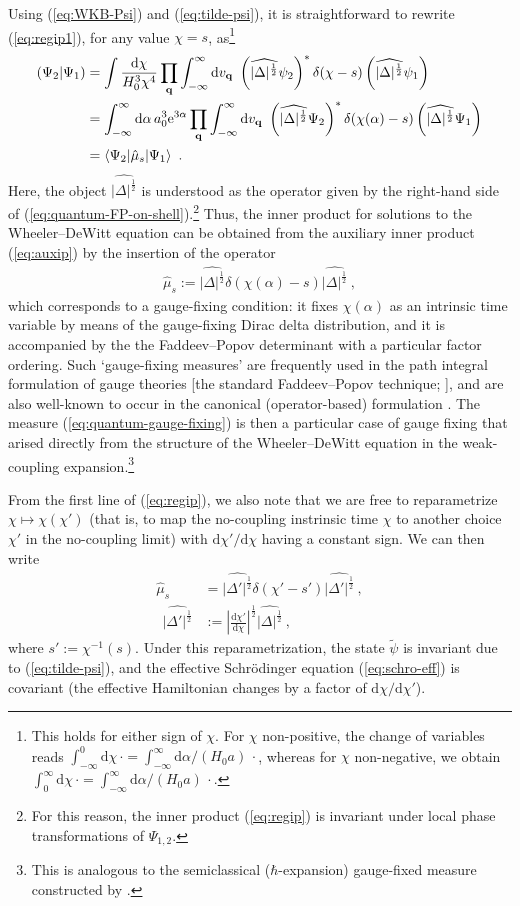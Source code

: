 \documentclass[12pt]{iopart}
\def\eq#1{\begin{equation}\begin{aligned}#1\end{aligned}\end{equation}}
\def\eref#1{(\ref{eq:#1})}
\def\D{\mathrm{d}}
\def\e{\mathrm{e}}
\def\Del#1#2{\frac{\D#1}{\D#2}}
\def\q{\mathbf{q}}
\begin{document}
Using \eref{WKB-Psi} and \eref{tilde-psi}, it is straightforward to rewrite \eref{regip1}, for any value $\chi = s$, as\footnote{This holds for either sign of $\chi$. For $\chi$ non-positive, the change of variables reads $\int_{-\infty}^0\D\chi\,\cdot = \int_{-\infty}^{\infty}\D\alpha /(H_0 a)\,\cdot$, whereas for $\chi$ non-negative, we obtain $\int_{0}^{\infty}\D\chi\,\cdot = \int_{-\infty}^{\infty}\D\alpha /(H_0 a)\,\cdot$.}
\eq{\label{eq:regip}
(\Psi_2|\Psi_1) &= \int\frac{\D\chi}{H_0^{3}\chi^4}\prod_{\q}\int_{-\infty}^{\infty}\D v_{\q}\ \left(\widehat{|\Delta|^{\frac12}}\psi_2\right)^*\delta(\chi-s)\left(\widehat{|\Delta|^{\frac12}}\psi_1\right)\\
 &= \int_{-\infty}^{\infty}\D\alpha\,  a_0^3\e^{3\alpha}\prod_{\q}\int_{-\infty}^{\infty}\D v_{\q}\ \left(\widehat{|\Delta|^{\frac12}}\Psi_2\right)^*\delta(\chi(\alpha)-s)\left(\widehat{|\Delta|^{\frac12}}\Psi_1\right)\\
 &=\braket{\Psi_2|\hat{\mu}_s|\Psi_1} \ .
}
Here, the object $\widehat{|\Delta|^{\frac12}}$ is understood as the operator given by the right-hand side of \eref{quantum-FP-on-shell}.\footnote{For this reason, the inner product \eref{regip} is invariant under local phase transformations of $\Psi_{1,2}$.} Thus, the inner product for solutions to the Wheeler--DeWitt equation can be obtained from the auxiliary inner product \eref{auxip} by the insertion of the operator
\eq{\label{eq:quantum-gauge-fixing}
\hat{\mu}_s := \widehat{|\Delta|^{\frac12}}\delta(\chi(\alpha)-s)\widehat{|\Delta|^{\frac12}} \ ,
}
which corresponds to a gauge-fixing condition: it fixes $\chi(\alpha)$ as an intrinsic time variable by means of the gauge-fixing Dirac delta distribution, and it is accompanied by the the Faddeev--Popov determinant with a particular factor ordering. Such `gauge-fixing measures' are frequently used in the path integral formulation of gauge theories [the standard Faddeev--Popov technique; \citet{Faddeev:1967fc,Faddeev:1973zb,HT:book}], and are also well-known to occur in the canonical (operator-based) formulation \citep{HT:book,Woodard:1989ac}. The measure \eref{quantum-gauge-fixing} is then a particular case of gauge fixing that arised directly from the structure of the Wheeler--DeWitt equation in the weak-coupling expansion.\footnote{This is analogous to the semiclassical ($\hbar$-expansion) gauge-fixed measure constructed by \citet{Barvinsky:1990qx,Barvinsky:1993jf}.}

From the first line of \eref{regip}, we also note that we are free to reparametrize $\chi\mapsto\chi(\chi')$ (that is, to map the no-coupling instrinsic time $\chi$ to another choice $\chi'$ in the no-coupling limit) with $\D\chi'/\D\chi$ having a constant sign. We can then write 
\eq{
\hat{\mu}_s &= \widehat{|\Delta'|^{\frac12}}\delta(\chi'-s')\widehat{|\Delta'|^{\frac12}} \ ,\\
\ \ \widehat{|\Delta'|^{\frac12}} &:= \left|\Del{\chi'}{\chi}\right|^{\frac12}\widehat{|\Delta|^{\frac12}} \ ,
}
where $s' := \chi^{-1}(s)$. Under this reparametrization, the state $\tilde{\psi}$ is invariant due to \eref{tilde-psi}, and the effective Schr\"odinger equation \eref{schro-eff} is covariant (the effective Hamiltonian changes by a factor of $\D\chi/\D\chi'$).
\end{document}
